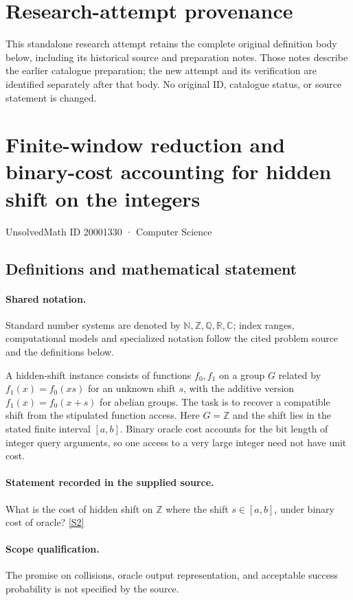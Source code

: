 \documentclass[11pt]{article}
\begin{document}
\section*{Research-attempt provenance}
This standalone research attempt retains the complete original definition body below,
including its historical source and preparation notes. Those notes describe the
earlier catalogue preparation; the new attempt and its verification are identified
separately after that body. No original ID, catalogue status, or source statement is changed.

\section{Finite-window reduction and binary-cost accounting for hidden shift on the integers}\label{20001330}
{\small UnsolvedMath ID 20001330 · Computer Science}
\subsection{Definitions and mathematical statement}

\paragraph{Shared notation.}Standard number systems are denoted by $\mathbb N,\mathbb Z,\mathbb Q,\mathbb R,\mathbb C$; index ranges, computational models and specialized notation follow the cited problem source and the definitions below.


A hidden-shift instance consists of functions $f_0,f_1$ on a group $G$ related by $f_1(x)=f_0(xs)$ for an unknown shift $s$, with the additive version $f_1(x)=f_0(x+s)$ for abelian groups. The task is to recover a compatible shift from the stipulated function access. Here $G=\mathbb Z$ and the shift lies in the stated finite interval $[a,b]$. Binary oracle cost accounts for the bit length of integer query arguments, so one access to a very large integer need not have unit cost.
\paragraph{Statement recorded in the supplied source.}
What is the cost of hidden shift on $\mathbb Z$ where the shift $s\in [a,b]$, under binary cost of oracle? \href{http://aimpl.org/quantumalg/4/}{[S2]}
\paragraph{Scope qualification.}
The promise on collisions, oracle output representation, and acceptable success probability is not specified by the source.
\end{document}
